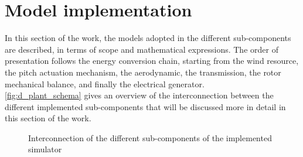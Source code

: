 \newpage
\clearpage
\section{Model implementation}\label{sec:c_basic_model_model}
In this section of the work, the models adopted in the different sub-components are described, in terms of scope and mathematical expressions. The order of presentation follows the energy conversion chain, starting from the wind resource, the pitch actuation mechanism, the aerodynamic, the transmission, the rotor mechanical balance, and finally the electrical generator.\\
\autoref{fig:d_plant_schema} gives an overview of the interconnection between the different implemented sub-components that will be discussed more in detail in this section of the work.
\begin{figure}[htb]
  \centering
  
  \caption{Interconnection of the different sub-components of the implemented simulator}
  \label{fig:d_plant_schema}
\end{figure}

